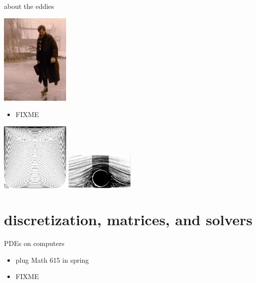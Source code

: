 \documentclass[10pt,hyperref,dvipsnames]{beamer}
\begin{document}
\begin{frame}{about the eddies}

\hfill \includegraphics[width=0.25\textwidth]{figs/people/hkmoffatt.png}

\begin{itemize}
\item FIXME
\end{itemize}

\hfill \includegraphics[width=0.25\textwidth]{figs/eddies1.png} \includegraphics[width=0.25\textwidth]{figs/cylindereddies.pdf}
\end{frame}


\section{discretization, matrices, and solvers}

\begin{frame}{PDEs on computers}

\begin{itemize}
\item plug Math 615 in spring
\item FIXME
\end{itemize}
\end{frame}
\end{document}
